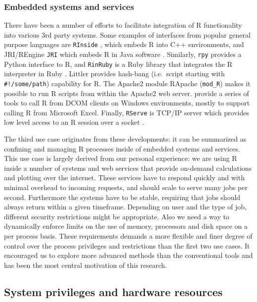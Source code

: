 \documentclass[article]{jss}
\newcommand{\R}{\textsf{R}\xspace}
\newcommand{\Java}{\textsf{Java}\xspace}
\newcommand{\Cpp}{\textsf{C++}\xspace}
\newcommand{\Python}{\textsf{Python}\xspace}
\newcommand{\Ruby}{\textsf{Ruby}\xspace}
\begin{document}
\subsubsection{Embedded systems and services}

There have been a number of efforts to facilitate integration of \R
functionality into various 3rd party systems. Some examples of interfaces from
popular general purpose languages are \texttt{RInside} \citep{RInside}, which
embeds \R into \Cpp environments, and JRI/REngine \texttt{JRI} which
embeds \R in \Java software \citep{JRI,urbanek2007rjava}. Similarly,
\texttt{rpy} \citep{moreira2006rpy,gautier2008rpy2} provides a \Python interface to \R, and
\texttt{RinRuby} is a \Ruby library that integrates the \R interpreter in Ruby
\citep{dahl2008rinruby}. Littler provides hash-bang (i.e.\ script starting with \texttt{\#!/some/path}) capability for
\R \citep{littler}. The Apache2 module RApache  (\texttt{mod\_R})
\citep{rapache} makes it possible to run \R scripts from within the
Apache2 web server. \cite{heiberger2009r} provide a series of tools to call
\R from DCOM clients on Windows environments, mostly to support
calling \R from Microsoft Excel. Finally, \texttt{RServe} is TCP/IP
server which provides low level access to an \R session over a socket
\citep{Rserve}.

The third use case originates from these developments: it can be summarized as
confining and managing \R processes inside of embedded systems and
services. This use case is largely derived from our personal experience: we are
using \R inside a number of systems and web services that provide
on-demand calculations and plotting over the internet. These services have to
respond quickly and with minimal overhead to incoming requests, and should
scale to serve many jobs per second. Furthermore the systems have to be stable,
requiring that jobs should always return within a given timeframe. Depending on
user and the type of job, different security restrictions might be appropriate.
Also we need a way to dynamically enforce limits on the use of memory,
processors and disk space on a per process basis. These requirements demands
a more flexible and finer degree of control over the process privileges and
restrictions than the first two use cases. It encouraged us to explore more
advanced methods than the conventional tools and has been the most central
motivation of this research.

\subsection{System privileges and hardware resources}
\end{document}
